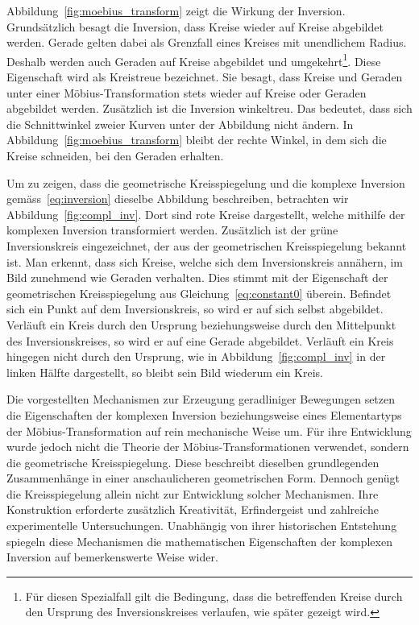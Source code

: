 Abbildung~\ref{fig:moebius_transform} zeigt die Wirkung der Inversion.
Grundsätzlich besagt die Inversion, 
dass Kreise wieder auf Kreise abgebildet werden.
Gerade gelten dabei als Grenzfall eines Kreises mit 
unendlichem Radius.
Deshalb werden auch Geraden auf Kreise 
abgebildet und 
umgekehrt\footnote{Für diesen Spezialfall gilt die Bedingung, 
dass die betreffenden Kreise durch den Ursprung des Inversionskreises 
verlaufen, wie später gezeigt wird.}.
Diese Eigenschaft wird als Kreistreue bezeichnet.
Sie besagt, dass Kreise und Geraden unter einer Möbius-Transformation 
stets wieder auf Kreise oder Geraden abgebildet werden.
Zusätzlich ist die Inversion winkeltreu.
Das bedeutet, dass sich die Schnittwinkel zweier Kurven unter 
der Abbildung nicht ändern.
In Abbildung~\ref{fig:moebius_transform} bleibt der rechte Winkel,
in dem sich die Kreise schneiden, bei den Geraden erhalten.


Um zu zeigen, dass die geometrische Kreisspiegelung und die komplexe 
Inversion gemäss~\eqref{eq:inversion} 
dieselbe Abbildung beschreiben, 
betrachten wir Abbildung~\ref{fig:compl_inv}.
Dort sind rote Kreise dargestellt, 
welche mithilfe der komplexen Inversion transformiert werden.
Zusätzlich ist der grüne Inversionskreis eingezeichnet, 
der aus der geometrischen Kreisspiegelung bekannt ist.
Man erkennt, dass sich Kreise, 
welche sich dem Inversionskreis annähern, 
im Bild zunehmend wie Geraden verhalten.
Dies stimmt mit der Eigenschaft der geometrischen Kreisspiegelung 
aus Gleichung~\eqref{eq:constant0} überein.
Befindet sich ein Punkt auf dem Inversionskreis, 
so wird er auf sich selbst abgebildet.
Verläuft ein Kreis durch den Ursprung beziehungsweise 
durch den Mittelpunkt des Inversionskreises, 
so wird er auf eine Gerade abgebildet.
Verläuft ein Kreis hingegen nicht durch den Ursprung, 
wie in Abbildung~\ref{fig:compl_inv} in der linken Hälfte dargestellt, 
so bleibt sein Bild wiederum ein Kreis.


Die vorgestellten Mechanismen zur Erzeugung geradliniger 
Bewegungen setzen 
die Eigenschaften der komplexen Inversion beziehungsweise
eines Elementartyps der Möbius-Transformation auf rein mechanische 
Weise um.
Für ihre Entwicklung wurde jedoch nicht die Theorie 
der Möbius-Transformationen verwendet, sondern 
die geometrische Kreisspiegelung.
Diese beschreibt dieselben grundlegenden Zusammenhänge 
in einer anschaulicheren geometrischen Form.
Dennoch genügt die Kreisspiegelung allein nicht zur Entwicklung 
solcher Mechanismen.
Ihre Konstruktion erforderte zusätzlich Kreativität, 
Erfindergeist und zahlreiche experimentelle Untersuchungen.
Unabhängig von ihrer historischen Entstehung spiegeln 
diese Mechanismen die mathematischen Eigenschaften 
der komplexen Inversion auf bemerkenswerte Weise wider.
